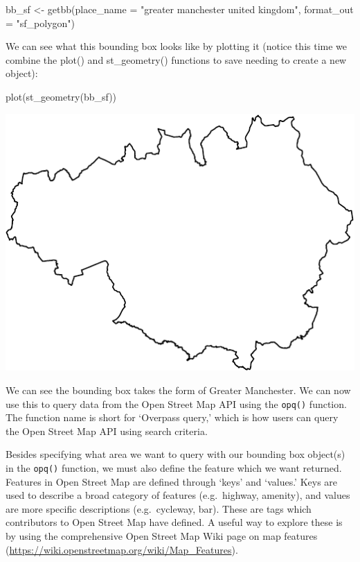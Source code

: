 \documentclass[
]{book}
\newenvironment{Shaded}{\begin{snugshade}}{\end{snugshade}}
\newcommand{\AttributeTok}[1]{\textcolor[rgb]{0.77,0.63,0.00}{#1}}
\newcommand{\FunctionTok}[1]{\textcolor[rgb]{0.00,0.00,0.00}{#1}}
\newcommand{\NormalTok}[1]{#1}
\newcommand{\OtherTok}[1]{\textcolor[rgb]{0.56,0.35,0.01}{#1}}
\newcommand{\StringTok}[1]{\textcolor[rgb]{0.31,0.60,0.02}{#1}}
\begin{document}
\begin{Shaded}
\begin{Highlighting}[]
\NormalTok{bb\_sf }\OtherTok{\textless{}{-}} \FunctionTok{getbb}\NormalTok{(}\AttributeTok{place\_name =} \StringTok{"greater manchester united kingdom"}\NormalTok{, }
               \AttributeTok{format\_out =} \StringTok{"sf\_polygon"}\NormalTok{)}
\end{Highlighting}
\end{Shaded}

We can see what this bounding box looks like by plotting it (notice this time we combine the plot() and st\_geometry() functions to save needing to create a new object):

\begin{Shaded}
\begin{Highlighting}[]
\FunctionTok{plot}\NormalTok{(}\FunctionTok{st\_geometry}\NormalTok{(bb\_sf))}
\end{Highlighting}
\end{Shaded}

\includegraphics{crime_mapping_files/figure-latex/plot_bb-1.pdf}

We can see the bounding box takes the form of Greater Manchester. We can now use this to query data from the Open Street Map API using the \texttt{opq()} function. The function name is short for `Overpass query,' which is how users can query the Open Street Map API using search criteria.

Besides specifying what area we want to query with our bounding box object(s) in the \texttt{opq()} function, we must also define the feature which we want returned. Features in Open Street Map are defined through `keys' and `values.' Keys are used to describe a broad category of features (e.g.~highway, amenity), and values are more specific descriptions (e.g.~cycleway, bar). These are tags which contributors to Open Street Map have defined. A useful way to explore these is by using the comprehensive Open Street Map Wiki page on map features (\url{https://wiki.openstreetmap.org/wiki/Map_Features}).
\end{document}
